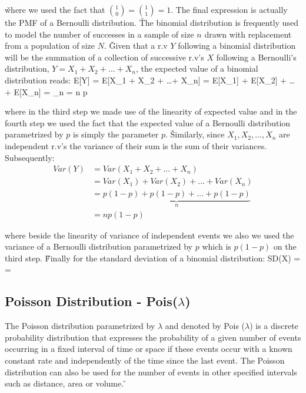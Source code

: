 \v

where we used the fact that $\binom{1}{0} = \binom{1}{1} = 1$. The final expression is actually the PMF of a
Bernoulli distribution. \v

The binomial distribution is frequently used to model the number of successes in a sample of size $n$ drawn with
replacement from a population of size $N$. \v

Given that a r.v $Y$ following a binomial distribution will be the summation of a collection of successive r.v's $X$
following a Bernoulli's distribution, $Y = X_{1} + X_{2} + \ldots + X_{n}$, the expected value of a binomial
distribution reads:
\bse
E[Y] = E[X_{1} + X_{2} + \ldots + X_{n}] = E[X_{1}] + E[X_{2}] + \ldots + E[X_{n}]
= _{n} = n p
\ese

where in the third step we made use of the linearity of expected value and in the fourth step we used the fact that
the expected value of a Bernoulli distribution parametrized by $p$ is simply the parameter $p$. \v

Similarly, since ${X_{1}, X_{2}, \ldots, X_{n}}$ are independent r.v's the variance of their sum is the sum of their
variances. Subsequently:
{\setlength{\jot}{10pt}
\begin{align*}
Var(Y) &= Var(X_{1} + X_{2} + \ldots + X_{n}) \\
&= Var(X_{1}) + Var(X_{2}) + \ldots + Var(X_{n}) \\
&= \underbrace{p(1-p) + p(1-p) + \ldots + p(1-p)}_{n} \\
&= n p(1-p)
\end{align*}}

where beside the linearity of variance of independent events we also we used the variance of a Bernoulli distribution
parametrized by $p$ which is $p(1-p)$ on the third step. \v

Finally for the standard deviation of a binomial distribution:
\bse
SD(X) =  = 
\ese

\subsection{Poisson Distribution - Pois($\lambda$)}

The Poisson distribution parametrized by $\lambda$ and denoted by Pois ($\lambda$) is a discrete probability
distribution that expresses the probability of a given number of events occurring in a fixed interval of time or
space if these events occur with a known constant rate and independently of the time since the last event. The
Poisson distribution can also be used for the number of events in other specified intervals such as distance, area or
volume. \v

